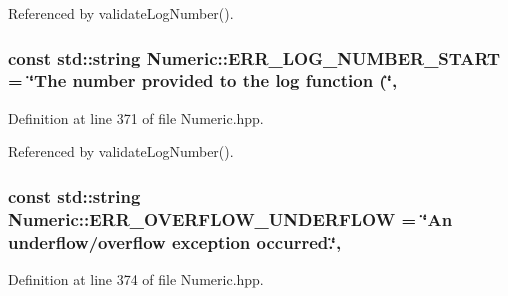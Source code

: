Referenced by validate\-Log\-Number().

\hypertarget{classmultiscale_1_1Numeric_a88ca9309ade745700dacbdc7c0d713f2}{
\subsubsection[{E\-R\-R\-\_\-\-L\-O\-G\-\_\-\-N\-U\-M\-B\-E\-R\-\_\-\-S\-T\-A\-R\-T}]{\setlength{\rightskip}{0pt plus 5cm}const std\-::string Numeric\-::\-E\-R\-R\-\_\-\-L\-O\-G\-\_\-\-N\-U\-M\-B\-E\-R\-\_\-\-S\-T\-A\-R\-T = \char`\"{}The number provided to the {\bf log} function (\char`\"{}\hspace{0.3cm}{\ttfamily [static]}, {\ttfamily [private]}}}\label{classmultiscale_1_1Numeric_a88ca9309ade745700dacbdc7c0d713f2}


Definition at line 371 of file Numeric.\-hpp.



Referenced by validate\-Log\-Number().

\hypertarget{classmultiscale_1_1Numeric_aa56bde8322d97ccc99c252b951d44a9d}{
\subsubsection[{E\-R\-R\-\_\-\-O\-V\-E\-R\-F\-L\-O\-W\-\_\-\-U\-N\-D\-E\-R\-F\-L\-O\-W}]{\setlength{\rightskip}{0pt plus 5cm}const std\-::string Numeric\-::\-E\-R\-R\-\_\-\-O\-V\-E\-R\-F\-L\-O\-W\-\_\-\-U\-N\-D\-E\-R\-F\-L\-O\-W = \char`\"{}An underflow/overflow exception occurred.\char`\"{}\hspace{0.3cm}{\ttfamily [static]}, {\ttfamily [private]}}}\label{classmultiscale_1_1Numeric_aa56bde8322d97ccc99c252b951d44a9d}


Definition at line 374 of file Numeric.\-hpp.

